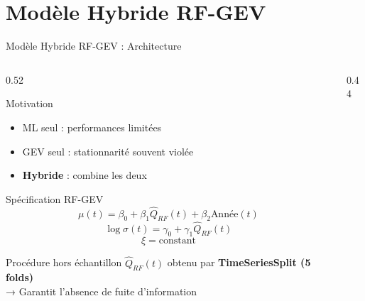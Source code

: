 \documentclass[aspectratio=169, 9pt]{beamer}
\begin{document}
\section{Modèle Hybride RF-GEV}

\begin{frame}{Modèle Hybride RF-GEV : Architecture}
\begin{columns}[T]
\begin{column}{0.52\textwidth}
  \begin{alertblock}{Motivation}
  \small
    \begin{itemize}
      \item ML seul : performances limitées
      \item GEV seul : stationnarité souvent violée
      \item \textbf{Hybride} : combine les deux
    \end{itemize}
  \end{alertblock}
  \vspace{0.1cm}
  \begin{block}{Spécification RF-GEV}
    \begin{equation*}
      \mu(t) = \beta_0 + \beta_1\hat{Q}_{RF}(t)
      + \beta_2\text{Année}(t)
    \end{equation*}
    \begin{equation*}
      \log\sigma(t) = \gamma_0 + \gamma_1\hat{Q}_{RF}(t)
    \end{equation*}
    \begin{equation*}
      \xi = \text{constant}
    \end{equation*}
  \end{block}
  \vspace{0.1cm}
  \begin{block}{Procédure hors échantillon}
  \small
    $\hat{Q}_{RF}(t)$ obtenu par
    \textbf{TimeSeriesSplit (5 folds)}\\
    → Garantit l'absence de fuite d'information
  \end{block}
\end{column}
\begin{column}{0.44\textwidth}
\begin{center}
\end{center}
\end{column}
\end{columns}
\end{frame}
\end{document}
